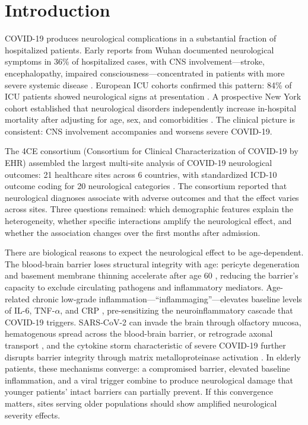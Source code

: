 \documentclass{article}
\begin{document}
\section{Introduction}

COVID-19 produces neurological complications in a substantial fraction of hospitalized patients.
Early reports from Wuhan documented neurological symptoms in 36\% of hospitalized cases, with CNS involvement---stroke, encephalopathy, impaired consciousness---concentrated in patients with more severe systemic disease \cite{mao2020neuro}.
European ICU cohorts confirmed this pattern: 84\% of ICU patients showed neurological signs at presentation \cite{helms2020neuro}.
A prospective New York cohort established that neurological disorders independently increase in-hospital mortality after adjusting for age, sex, and comorbidities \cite{frontera2021neuro}.
The clinical picture is consistent: CNS involvement accompanies and worsens severe COVID-19.

The 4CE consortium (Consortium for Clinical Characterization of COVID-19 by EHR) assembled the largest multi-site analysis of COVID-19 neurological outcomes: 21 healthcare sites across 6 countries, with standardized ICD-10 outcome coding for 20 neurological categories \cite{four_ce_neuro2021}.
The consortium reported that neurological diagnoses associate with adverse outcomes and that the effect varies across sites.
Three questions remained: which demographic features explain the heterogeneity, whether specific interactions amplify the neurological effect, and whether the association changes over the first months after admission.

There are biological reasons to expect the neurological effect to be age-dependent.
The blood-brain barrier loses structural integrity with age: pericyte degeneration and basement membrane thinning accelerate after age 60 \cite{montagne2015bbb}, reducing the barrier's capacity to exclude circulating pathogens and inflammatory mediators.
Age-related chronic low-grade inflammation---``inflammaging''---elevates baseline levels of IL-6, TNF-$\alpha$, and CRP \cite{franceschi2018inflammaging}, pre-sensitizing the neuroinflammatory cascade that COVID-19 triggers.
SARS-CoV-2 can invade the brain through olfactory mucosa, hematogenous spread across the blood-brain barrier, or retrograde axonal transport \cite{song2021neuroinvasion}, and the cytokine storm characteristic of severe COVID-19 further disrupts barrier integrity through matrix metalloproteinase activation \cite{iadecola2020covid}.
In elderly patients, these mechanisms converge: a compromised barrier, elevated baseline inflammation, and a viral trigger combine to produce neurological damage that younger patients' intact barriers can partially prevent.
If this convergence matters, sites serving older populations should show amplified neurological severity effects.
\end{document}
